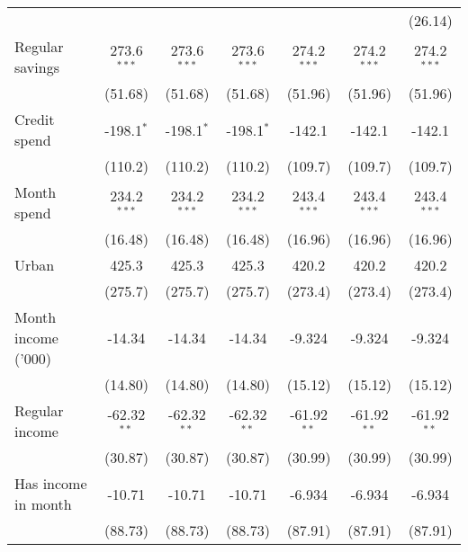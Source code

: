 \begin{table}[htbp]
\begin{footnotesize}
\begin{tabular}{lcccccc}
                                          &                &                &                &                &                & (26.14)\\
         Regular savings                  & 273.6$^{***}$  & 273.6$^{***}$  & 273.6$^{***}$  & 274.2$^{***}$  & 274.2$^{***}$  & 274.2$^{***}$\\
                                          & (51.68)        & (51.68)        & (51.68)        & (51.96)        & (51.96)        & (51.96)\\
         Credit spend                     & -198.1$^{*}$   & -198.1$^{*}$   & -198.1$^{*}$   & -142.1         & -142.1         & -142.1\\
                                          & (110.2)        & (110.2)        & (110.2)        & (109.7)        & (109.7)        & (109.7)\\
         Month spend                      & 234.2$^{***}$  & 234.2$^{***}$  & 234.2$^{***}$  & 243.4$^{***}$  & 243.4$^{***}$  & 243.4$^{***}$\\
                                          & (16.48)        & (16.48)        & (16.48)        & (16.96)        & (16.96)        & (16.96)\\
         Urban                            & 425.3          & 425.3          & 425.3          & 420.2          & 420.2          & 420.2\\
                                          & (275.7)        & (275.7)        & (275.7)        & (273.4)        & (273.4)        & (273.4)\\
         Month income ('000)              & -14.34         & -14.34         & -14.34         & -9.324         & -9.324         & -9.324\\
                                          & (14.80)        & (14.80)        & (14.80)        & (15.12)        & (15.12)        & (15.12)\\
         Regular income                   & -62.32$^{**}$  & -62.32$^{**}$  & -62.32$^{**}$  & -61.92$^{**}$  & -61.92$^{**}$  & -61.92$^{**}$\\
                                          & (30.87)        & (30.87)        & (30.87)        & (30.99)        & (30.99)        & (30.99)\\
         Has income in month              & -10.71         & -10.71         & -10.71         & -6.934         & -6.934         & -6.934\\
                                          & (88.73)        & (88.73)        & (88.73)        & (87.91)        & (87.91)        & (87.91)\\

\end{tabular}
\end{footnotesize}
\end{table}
